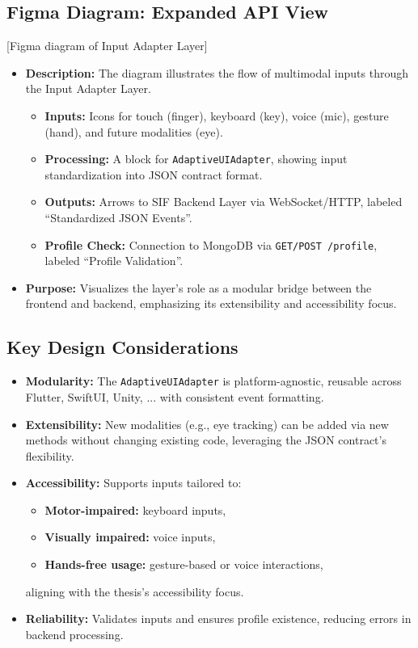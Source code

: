 \documentclass[openany]{book}
\begin{document}
    \subsection{Figma Diagram: Expanded API View}
    [Figma diagram of Input Adapter Layer]
    \begin{itemize}
    \item \textbf{Description:} The diagram illustrates the flow of multimodal inputs through the Input Adapter Layer.
    \begin{itemize}
        \item \textbf{Inputs:} Icons for touch (finger), keyboard (key), voice (mic), gesture (hand), and future modalities (eye).
        \item \textbf{Processing:} A block for \texttt{AdaptiveUIAdapter}, showing input standardization into JSON contract format.
        \item \textbf{Outputs:} Arrows to SIF Backend Layer via WebSocket/HTTP, labeled ``Standardized JSON Events''.
        \item \textbf{Profile Check:} Connection to MongoDB via \texttt{GET/POST /profile}, labeled ``Profile Validation''.
    \end{itemize}
    
    \item \textbf{Purpose:} Visualizes the layer’s role as a modular bridge between the frontend and backend, emphasizing its extensibility and accessibility focus.
\end{itemize}
\subsection{Key Design Considerations}
\begin{itemize}
    \item \textbf{Modularity:} The \texttt{AdaptiveUIAdapter} is platform-agnostic, reusable across Flutter, SwiftUI, Unity, ... with consistent event formatting.
    \item \textbf{Extensibility:} New modalities (e.g., eye tracking) can be added via new methods without changing existing code, leveraging the JSON contract’s flexibility.
    \item \textbf{Accessibility:} Supports inputs tailored to:
    \begin{itemize}
        \item \textbf{Motor-impaired:} keyboard inputs,
        \item \textbf{Visually impaired:} voice inputs,
        \item \textbf{Hands-free usage:} gesture-based or voice interactions,
    \end{itemize}
    aligning with the thesis’s accessibility focus.
    \item \textbf{Reliability:} Validates inputs and ensures profile existence, reducing errors in backend processing.
\end{itemize}
\end{document}

